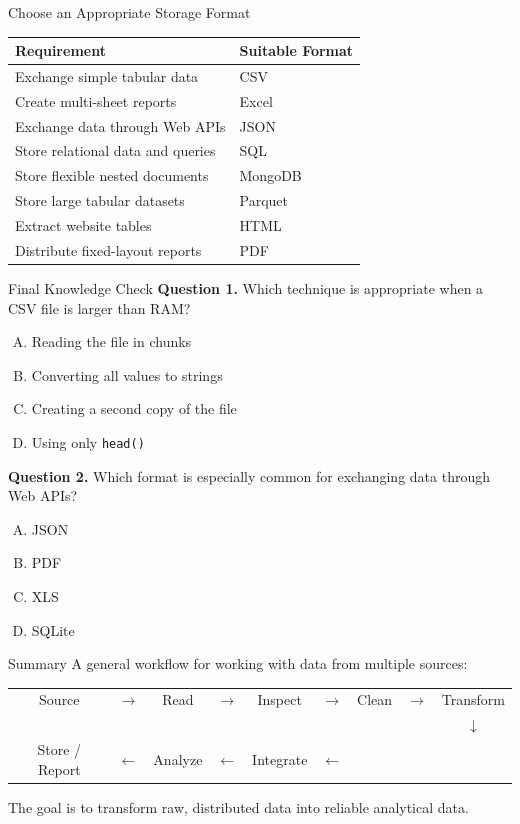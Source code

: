 \documentclass[aspectratio=169,11pt]{beamer}
\newcommand{\code}[1]{\texttt{#1}}
\newcommand{\smallgap}{\vspace{0.4em}}
\begin{document}
\begin{frame}{Choose an Appropriate Storage Format}
\begin{tabularx}{\textwidth}{lX}
\toprule
\textbf{Requirement} & \textbf{Suitable Format} \\
\midrule
Exchange simple tabular data & CSV \\
Create multi-sheet reports & Excel \\
Exchange data through Web APIs & JSON \\
Store relational data and queries & SQL \\
Store flexible nested documents & MongoDB \\
Store large tabular datasets & Parquet \\
Extract website tables & HTML \\
Distribute fixed-layout reports & PDF \\
\bottomrule
\end{tabularx}
\end{frame}

\begin{frame}{Final Knowledge Check}
\textbf{Question 1.} Which technique is appropriate when a CSV file is larger than RAM?
\begin{enumerate}[A.]
  \item Reading the file in chunks
  \item Converting all values to strings
  \item Creating a second copy of the file
  \item Using only \code{head()}
\end{enumerate}

\smallgap
\textbf{Question 2.} Which format is especially common for exchanging data through Web APIs?
\begin{enumerate}[A.]
  \item JSON
  \item PDF
  \item XLS
  \item SQLite
\end{enumerate}
\end{frame}

\begin{frame}{Summary}
A general workflow for working with data from multiple sources:
\begin{center}
\small
\begin{tabular}{ccccccccc}
Source & $\rightarrow$ & Read & $\rightarrow$ & Inspect & $\rightarrow$ & Clean & $\rightarrow$ & Transform \\[0.4em]
 & & & & & & & & $\downarrow$ \\[0.4em]
Store / Report & $\leftarrow$ & Analyze & $\leftarrow$ & Integrate & $\leftarrow$ & & &
\end{tabular}
\end{center}
\smallgap
The goal is to transform raw, distributed data into reliable analytical data.
\end{frame}
\end{document}
